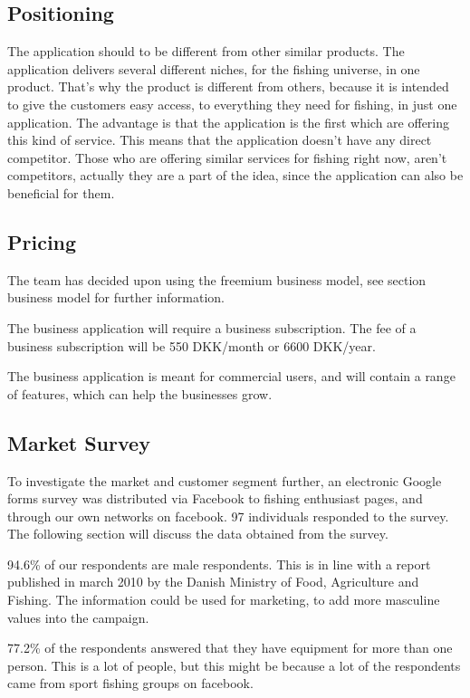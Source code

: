 \subsection{Positioning}
The application should to be different from other similar products. The application delivers several different niches, for the fishing universe, in one product. That's why the product is different from others, because it is intended to give the customers easy access, to everything they need for fishing, in just one application. The advantage is that the application is the first which are offering this kind of service. This means that the application doesn't have any direct competitor. Those who are offering similar services for fishing right now, aren't competitors, actually they are a part of the idea, since the application can also be beneficial for them.



\subsection{Pricing}
The team has decided upon using the freemium business model, see section business model for further information.

The business application will require a business subscription. The fee of a business subscription will be 550 DKK/month or 6600 DKK/year.

The business application is meant for commercial users, and will contain a range of features, which can help the businesses grow.



\subsection{Market Survey}
To investigate the market and customer segment further, an electronic Google forms survey was distributed via Facebook to fishing enthusiast pages, and through our own networks on facebook. 97 individuals responded to the survey. The following section will discuss the data obtained from the survey. 


94.6\% of our respondents are male respondents. This is in line with a report published in march 2010 by the Danish Ministry of Food, Agriculture and Fishing. The information could be used for marketing, to add more masculine values into the campaign.


77.2\% of the respondents answered that they have equipment for more than one person. This is a lot of people, but this might be because a lot of the respondents came from sport fishing groups on facebook.


